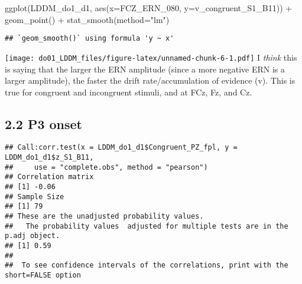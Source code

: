 \documentclass[
]{article}
\newenvironment{Shaded}{\begin{snugshade}}{\end{snugshade}}
\newcommand{\AttributeTok}[1]{\textcolor[rgb]{0.77,0.63,0.00}{#1}}
\newcommand{\FunctionTok}[1]{\textcolor[rgb]{0.00,0.00,0.00}{#1}}
\newcommand{\NormalTok}[1]{#1}
\newcommand{\SpecialCharTok}[1]{\textcolor[rgb]{0.00,0.00,0.00}{#1}}
\newcommand{\StringTok}[1]{\textcolor[rgb]{0.31,0.60,0.02}{#1}}
\begin{document}
\begin{Shaded}
\begin{Highlighting}[]
\FunctionTok{ggplot}\NormalTok{(LDDM\_do1\_d1, }\FunctionTok{aes}\NormalTok{(}\AttributeTok{x=}\NormalTok{FCZ\_ERN\_080, }\AttributeTok{y=}\NormalTok{v\_congruent\_S1\_B11)) }\SpecialCharTok{+}
  \FunctionTok{geom\_point}\NormalTok{() }\SpecialCharTok{+}
  \FunctionTok{stat\_smooth}\NormalTok{(}\AttributeTok{method=}\StringTok{"lm"}\NormalTok{)}
\end{Highlighting}
\end{Shaded}

\begin{verbatim}
## `geom_smooth()` using formula 'y ~ x'
\end{verbatim}

\texttt{[image: do01\_LDDM\_files/figure-latex/unnamed-chunk-6-1.pdf]} I
\emph{think} this is saying that the larger the ERN amplitude (since a
more negative ERN is a larger amplitude), the faster the drift
rate/accumulation of evidence (v). This is true for congruent and
incongruent stimuli, and at FCz, Fz, and Cz.

\hypertarget{p3-onset}{%
\subsection{2.2 P3 onset}\label{p3-onset}}

\begin{Shaded}
\end{Shaded}

\begin{verbatim}
## Call:corr.test(x = LDDM_do1_d1$Congruent_PZ_fpl, y = LDDM_do1_d1$z_S1_B11, 
##     use = "complete.obs", method = "pearson")
## Correlation matrix 
## [1] -0.06
## Sample Size 
## [1] 79
## These are the unadjusted probability values.
##   The probability values  adjusted for multiple tests are in the p.adj object. 
## [1] 0.59
## 
##  To see confidence intervals of the correlations, print with the short=FALSE option
\end{verbatim}

\begin{Shaded}
\end{Shaded}
\end{document}
